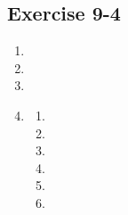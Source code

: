 \subsection{Exercise 9-4} %
  \begin{enumerate}[noitemsep, label=\textbf{\arabic*}.]

  \item %

  \item %

  \item %

  \item %
    \begin{enumerate}  \begin{enumerate}[noitemsep, label=\textbf{(\alph*)} ]
    \item %
    \item %
    \item %
    \item %
    \item %
    \item %
    \end{enumerate}
  \end{enumerate}
  \end{enumerate}
